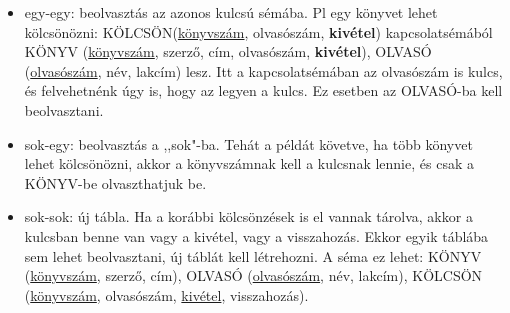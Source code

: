 \documentclass[margin=0px]{article}
\begin{document}
	\begin{itemize}
		\item egy-egy: beolvasztás az azonos kulcsú sémába. Pl egy könyvet lehet kölcsönözni: KÖLCSÖN(\underline{könyvszám}, olvasószám, \textbf{kivétel}) kapcsolatsémából KÖNYV (\underline{könyvszám}, szerző, cím, olvasószám, \textbf{kivétel}), OLVASÓ (\underline{olvasószám}, név, lakcím) lesz. Itt a kapcsolatsémában az olvasószám is kulcs, és felvehetnénk úgy is, hogy az legyen a kulcs. Ez esetben az OLVASÓ-ba kell beolvasztani.
		\item sok-egy: beolvasztás a ,,sok"-ba. Tehát a példát követve, ha több könyvet lehet kölcsönözni, akkor a könyvszámnak kell a kulcsnak lennie, és csak a KÖNYV-be olvaszthatjuk be.
		\item sok-sok: új tábla. Ha a korábbi kölcsönzések is el vannak tárolva, akkor a kulcsban benne van vagy a kivétel, vagy a visszahozás. Ekkor egyik táblába sem lehet beolvasztani, új táblát kell létrehozni. A séma ez lehet: KÖNYV (\underline{könyvszám}, szerző, cím), OLVASÓ (\underline{olvasószám}, név, lakcím), KÖLCSÖN (\underline{könyvszám}, olvasószám, \underline{kivétel}, visszahozás).
	\end{itemize}
	
\end{document}
